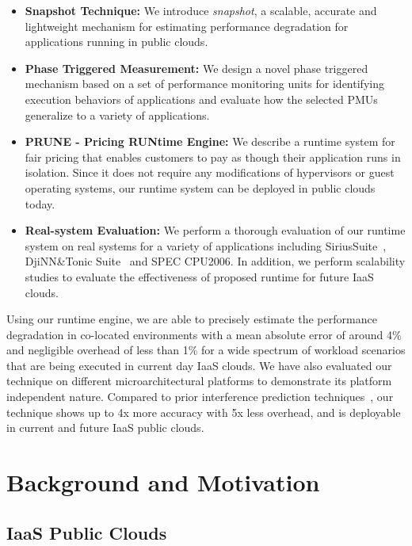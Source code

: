 \documentclass{sig-alternate}
\begin{document}
\begin{itemize}
\item \textbf{Snapshot Technique:} We introduce \textit{snapshot}, a scalable, accurate and lightweight mechanism for estimating performance degradation for applications running in public clouds. 

\item \textbf{Phase Triggered Measurement:} We design a novel phase triggered mechanism based on a set of performance monitoring units for identifying execution behaviors of applications and evaluate how the selected PMUs generalize to a variety of applications.

\item \textbf{PRUNE - Pricing RUNtime Engine:} We describe a runtime system for fair pricing that enables customers to pay as though their application runs in isolation. Since it does not require any modifications of hypervisors or guest operating systems, our runtime system can be deployed in public clouds today.

\item \textbf{Real-system Evaluation:} 
We perform a thorough evaluation of our runtime system on real systems for a variety of applications including SiriusSuite~\cite{sirius}, DjiNN\&Tonic Suite~\cite{djinn} and SPEC CPU2006. In addition, we perform scalability studies to evaluate the effectiveness of proposed runtime for future IaaS clouds.

\end{itemize}

Using our runtime engine, we are able to precisely estimate the performance degradation in co-located environments with a mean absolute error of around 4\% and negligible overhead of less than 1\% for a wide spectrum of workload scenarios that are being executed in current day IaaS clouds. We have also evaluated our technique on different microarchitectural platforms to demonstrate its platform independent nature. Compared to prior interference prediction techniques~\cite{fairpricing, 6844481}, our technique shows up to 4x more accuracy with 5x less overhead, and is deployable in current and future IaaS public clouds.
\section{Background and Motivation}
\label{sec:BackgroundandMotivation}
\subsection{IaaS Public Clouds}
\label{subsec:IaaSPublicClouds}
\end{document}
